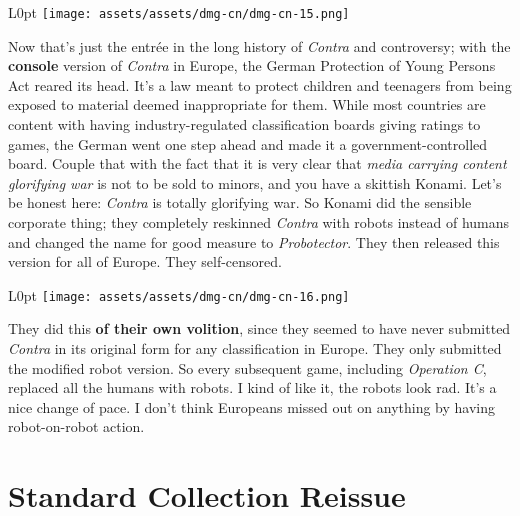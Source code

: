 \documentclass{book}
\begin{document}
\begin{wrapfigure}{L}{0pt} \texttt{[image: assets/assets/dmg-cn/dmg-cn-15.png]}\end{wrapfigure}
Now that’s just the entrée in the long history of \emph{Contra} and controversy; with the \textbf{console} version of \emph{Contra} in Europe, the German Protection of Young Persons Act reared its head. It’s a law meant to protect children and teenagers from being exposed to material deemed inappropriate for them. While most countries are content with having industry-regulated classification boards giving ratings to games, the German went one step ahead and made it a government-controlled board. Couple that with the fact that it is very clear that \emph{media carrying content glorifying war} is not to be sold to minors, and you have a skittish Konami. Let’s be honest here: \emph{Contra} is totally glorifying war. So Konami did the sensible corporate thing; they completely reskinned \emph{Contra} with robots instead of humans and changed the name for good measure to \emph{Probotector}. They then released this version for all of Europe. They self-censored.

\begin{wrapfigure}{L}{0pt} \texttt{[image: assets/assets/dmg-cn/dmg-cn-16.png]}\end{wrapfigure}
They did this \textbf{of their own volition}, since they seemed to have never submitted \emph{Contra} in its original form for any classification in Europe. They only submitted the modified robot version. So every subsequent game, including \emph{Operation C}, replaced all the humans with robots. I kind of like it, the robots look rad. It’s a nice change of pace. I don’t think Europeans missed out on anything by having robot-on-robot action.

\FloatBarrier\needspace{10mm}\section*{Standard Collection Reissue}\nopagebreak[4]
\end{document}
